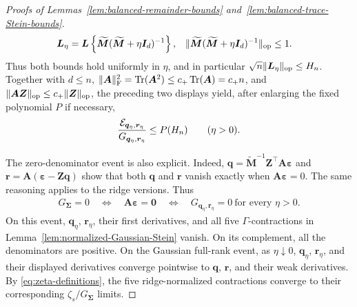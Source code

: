\documentclass{article}
\theoremstyle{plain}
\theoremstyle{definition}
\theoremstyle{definition}
\newcommand{\boldzero}{\mathbf{0}}
\DeclarePairedDelimiter\norm{\lVert}{\rVert}
\DeclareMathOperator{\trace}{Tr}
\def\mathbold{\boldsymbol}
\def\cal{\mathcal}
\def\bA{\mathbold{A}}\def\calA{{\cal A}}\def\scrA{{\mathscr A}}\def\Ahat{\widehat{A}}\def\Atil{{\widetilde A}}
\def\bI{\mathbold{I}}\def\hbI{{\widehat{\bI}}}\def\tbI{{\widetilde{\bI}}}
\def\bL{\mathbold{L}}\def\hbL{{\widehat{\bL}}}\def\tbL{{\widetilde{\bL}}}
\def\bM{\mathbold{M}}\def\hbM{{\widehat{\bM}}}\def\tbM{{\widetilde{\bM}}}
\def\bq{\mathbold{q}}\def\qhat{\widehat{q}}\def\qtil{\widetilde{q}}\def\qbar{{\overline q}}
\def\br{\mathbold{r}}\def\rhat{\widehat{r}}\def\rtil{\widetilde{r}}\def\rbar{{\overline r}}
\def\bZ{\mathbold{Z}}\def\hbZ{{\widehat{\bZ}}}\def\tbZ{{\widetilde{\bZ}}}
\def\ep{\varepsilon}\def\eps{\epsilon}\def\veps{\varepsilon}
\def\bep{ {\mathbold{\ep} }}
\def\bSigma{\mathbold{\Sigma}}\def\hbSigma{{\widehat{\bSigma}}}
\begin{document}
\begin{proof}[Proofs of Lemmas~\ref{lem:balanced-remainder-bounds}
and~\ref{lem:balanced-trace-Stein-bounds}]
\begin{align*}
    \bL_\eta
    &=\bL\left\{\widetilde{\bM}
       (\widetilde{\bM}+\eta\bI_d)^{-1}\right\},
    &
    \norm{\widetilde{\bM}
       (\widetilde{\bM}+\eta\bI_d)^{-1}}_{\rm op}&\leq1.
\end{align*}
Thus both bounds hold uniformly in $\eta$, and in particular
$\sqrt n\norm{\bL_\eta}_{\rm op}\leq H_n$.  Together with $d\leq n$,
$\norm{\bA}_{\rm F}^2=\trace(\bA^2)\leq c_+\trace(\bA)=c_+n$, and
$\norm{\bA\bZ}_{\rm op}\leq c_+\norm{\bZ}_{\rm op}$, the preceding two
displays yield, after enlarging the fixed polynomial $P$ if necessary,
\begin{align}
    \frac{\calE_{\bq_\eta,\br_\eta}}{G_{\bq_\eta,\br_\eta}}
    \leq P(H_n)
    \qquad(\eta>0).
    \label{eq:balanced-ridge-normalized-energy}
\end{align}

The zero-denominator event is also explicit. Indeed,
$\bq=\widetilde{\bM}^{-1}\bZ^\top\bA\bep$ and
$\br=\bA(\bep-\bZ\bq)$ show that both $\bq$ and $\br$
vanish exactly when $\bA\bep=0$. The same reasoning applies to
the ridge versions. Thus
\begin{align*}
    G_{\bSigma}=0
    \quad\Longleftrightarrow\quad
    \bA\bep=\boldzero
    \quad\Longleftrightarrow\quad
    G_{\bq_\eta,\br_\eta}=0\ \text{for every }\eta>0.
\end{align*}
On this event, $\bq_\eta$, $\br_\eta$, their first derivatives, and all five
$\Gamma$-contractions in Lemma~\ref{lem:normalized-Gaussian-Stein} vanish.  On
its complement, all the denominators are positive.  On the Gaussian full-rank
event, as $\eta\downarrow0$,
$\bq_\eta$, $\br_\eta$, and their displayed derivatives converge pointwise to
$\bq$, $\br$, and their weak derivatives.  By \eqref{eq:zeta-definitions},
the five ridge-normalized contractions converge to their corresponding
$\zeta_s/G_{\bSigma}$ limits.


\end{proof}
\end{document}
